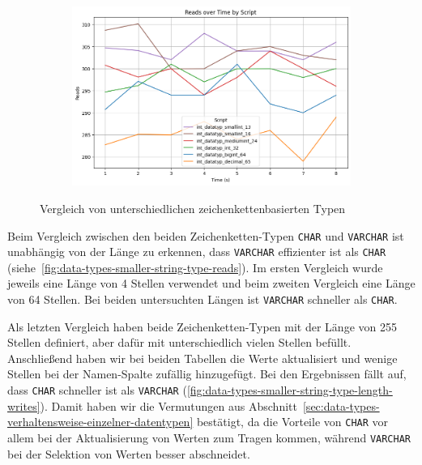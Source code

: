 \vspace{-24pt}
\begin{figure}[H]
    \centering
    \begin{subfigure}[t]{0.48\textwidth}
        \centering
        \includegraphics[width=\textwidth]{PNGs/Script/Data_Types/Smaller/number-type/Reads}
    \end{subfigure}
    \vspace{-10pt}
    \caption[Datentypen: Numerische Datentypen]{Vergleich von unterschiedlichen zeichenkettenbasierten Typen}
    \label{data-types-smaller-number-type-reads}
\end{figure}
\vspace{-20pt}

Beim Vergleich zwischen den beiden Zeichenketten-Typen \texttt{CHAR} und \texttt{VARCHAR} ist unabhängig von der Länge zu erkennen, dass \texttt{VARCHAR} effizienter ist als \texttt{CHAR} (siehe~\ref{fig:data-types-smaller-string-type-reads}).
Im ersten Vergleich wurde jeweils eine Länge von 4 Stellen verwendet und beim zweiten Vergleich eine Länge von 64 Stellen.
Bei beiden untersuchten Längen ist \texttt{VARCHAR} schneller als \texttt{CHAR}.

Als letzten Vergleich haben beide Zeichenketten-Typen mit der Länge von 255 Stellen definiert, aber dafür mit unterschiedlich vielen Stellen befüllt.
Anschließend haben wir bei beiden Tabellen die Werte aktualisiert und wenige Stellen bei der Namen-Spalte zufällig hinzugefügt.
Bei den Ergebnissen fällt auf, dass \texttt{CHAR} schneller ist als \texttt{VARCHAR} (\ref{fig:data-types-smaller-string-type-length-writes}).
Damit haben wir die Vermutungen aus Abschnitt~\ref{sec:data-types-verhaltensweise-einzelner-datentypen} bestätigt, da die Vorteile von \texttt{CHAR} vor allem bei der Aktualisierung von Werten zum Tragen kommen, während \texttt{VARCHAR} bei der Selektion von Werten besser abschneidet.

